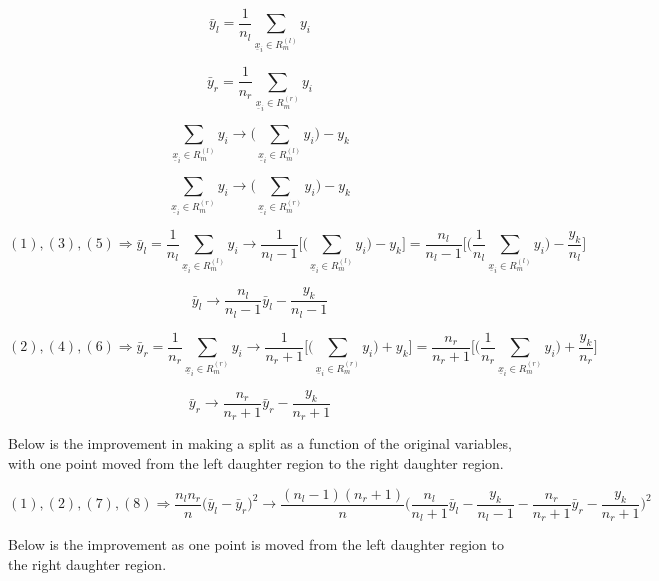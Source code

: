 \documentclass[11pt]{article}
\begin{document}
\begin{equation}
\bar{y}_l = \frac{1}{n_l}\sum_{\underline{x}_i \in R_m^{(l)}}y_i
\end{equation}

\begin{equation}
\bar{y}_r = \frac{1}{n_r}\sum_{\underline{x}_i \in R_m^{(r)}}y_i
\end{equation}

\begin{equation}
\sum_{ \underline{x}_i \in R_m^{(l)}} y_i \rightarrow \bigg( \sum_{ \underline{x}_i \in R_m^{(l)}}y_i \bigg) - y_k
\end{equation}

\begin{equation}
\sum_{ \underline{x}_i \in R_m^{(r)}} y_i \rightarrow \bigg( \sum_{ \underline{x}_i \in R_m^{(r)}}y_i \bigg) - y_k
\end{equation}

$$(1), (3), (5) \Rightarrow \bar{y}_l = \frac{1}{n_l}\sum_{\underline{x}_i \in R_m^{(l)}}y_i \rightarrow \frac{1}{n_l-1}\Bigg[\bigg(\sum_{\underline{x}_i \in R_m^{(l)}}y_i\bigg)-y_k\Bigg] = \frac{n_l}{n_l-1}\Bigg[\bigg(\frac{1}{n_l}\sum_{\underline{x}_i \in R_m^{(l)}}y_i\bigg) - \frac{y_k}{n_l}\Bigg]$$

\begin{equation}
\bar{y}_l \rightarrow \frac{n_l}{n_l-1}\bar{y}_l - \frac{y_k}{n_l-1}
\end{equation}

$$(2), (4), (6) \Rightarrow \bar{y}_r = \frac{1}{n_r}\sum_{\underline{x}_i \in R_m^{(r)}}y_i \rightarrow \frac{1}{n_r+1}\Bigg[\bigg(\sum_{\underline{x}_i \in R_m^{(r)}}y_i\bigg)+y_k\Bigg] = \frac{n_r}{n_r+1}\Bigg[\bigg(\frac{1}{n_r}\sum_{\underline{x}_i \in R_m^{(r)}}y_i\bigg) + \frac{y_k}{n_r}\Bigg]$$

\begin{equation}
\bar{y}_r \rightarrow \frac{n_r}{n_r+1}\bar{y}_r - \frac{y_k}{n_r+1}
\end{equation}

Below is the improvement in making a split as a function of the original 
variables, with one point moved from the left daughter region to the right 
daughter region. 

$$(1), (2), (7), (8) \Rightarrow \frac{n_ln_r}{n} \big(\bar{y}_l - \bar{y}_r\big)^2 \rightarrow \frac{(n_l-1)(n_r+1)}{n}\bigg(\frac{n_l}{n_l+1}\bar{y}_l - \frac{y_k}{n_l-1} - \frac{n_r}{n_r+1}\bar{y}_r - \frac{y_k}{n_r + 1}\bigg)^2$$

Below is the improvement as one point is moved from the left daughter region to 
the right daughter region. 
\end{document}
